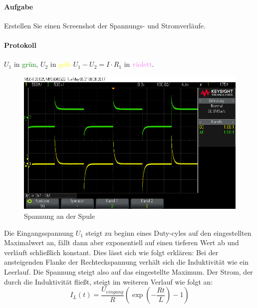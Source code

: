 \documentclass[10pt]{scrreprt}
\begin{document}
        \paragraph{Aufgabe}
        Erstellen Sie einen Screenshot der Spannungs- und Stromverläufe.

        \paragraph{Protokoll}
        $U_1$ in \textcolor{green}{grün}, $U_2$ in \textcolor{yellow}{gelb}
        $U_1 - U_2 = I \cdot R_1$ in \textcolor{violet}{violett}.
        \begin{center}
            \begin{figure}[H]
                \includegraphics[width=\textwidth]{scope_2.png}
                \caption{Spannung an der Spule}
                \label{fig:spannspul}
            \end{figure}
        \end{center}

        Die Eingangsspannung $U_1$ steigt zu beginn eines Duty-cyles auf den
        eingestellten Maximalwert an, fällt dann aber exponentiell auf einen tieferen
        Wert ab und verläuft schließlich konstant. Dies lässt sich wie folgt erklären:
        Bei der ansteigenden Flanke der Rechteckspannung verhält sich die Induktivität
        wie ein Leerlauf. Die Spannung steigt also auf das eingestellte Maximum. Der Strom,
        der durch die Induktivität fließt, steigt im weiteren Verlauf wie folgt an:
        \begin{equation}
            I_L(t) = \frac{U_{eingang}}{R}\left(\exp{\left(-\frac{Rt}{L}\right)} - 1\right)
            \label{eq:ISpule}
        \end{equation}
\end{document}

